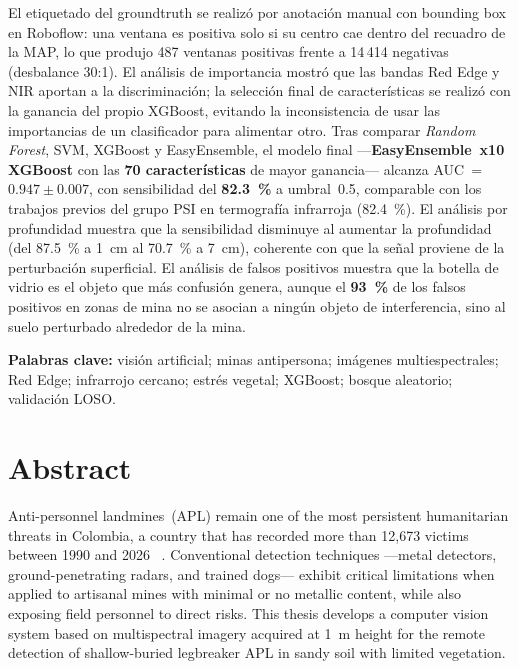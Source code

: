 El etiquetado del groundtruth se realizó por anotación manual con bounding box en
Roboflow: una ventana es positiva solo si su centro cae dentro del recuadro de la
\ac{MAP}, lo que produjo 487 ventanas positivas frente a 14\,414 negativas
(desbalance 30:1). El análisis de importancia mostró que las bandas Red Edge y \ac{NIR} aportan a
la discriminación; la selección final de características se realizó con la ganancia
del propio XGBoost, evitando la inconsistencia de usar las importancias de un
clasificador para alimentar otro. Tras comparar \textit{Random Forest},
\ac{SVM}, XGBoost y EasyEnsemble, el modelo final ---\textbf{EasyEnsemble~x10
XGBoost} con las \textbf{70 características} de mayor ganancia--- alcanza
AUC~=~$0.947 \pm 0.007$, con sensibilidad del \textbf{82.3~\%} a umbral~0.5,
comparable con los trabajos previos del grupo \ac{PSI} en termografía infrarroja
(82.4~\%). El análisis por profundidad muestra que la sensibilidad disminuye al
aumentar la profundidad (del 87.5~\% a \SI{1}{cm} al 70.7~\% a \SI{7}{cm}),
coherente con que la señal proviene de la perturbación superficial. El análisis de
falsos positivos muestra que la botella de vidrio es el objeto que más confusión
genera, aunque el \textbf{93~\%} de los falsos positivos en zonas de mina no se
asocian a ningún objeto de interferencia, sino al suelo perturbado alrededor de la mina.

\vspace{6pt}
\noindent\textbf{Palabras clave:} visión artificial; minas antipersona; imágenes
multiespectrales; Red Edge; infrarrojo cercano; estrés vegetal; XGBoost; bosque
aleatorio; validación LOSO.

\clearpage

\chapter*{Abstract}
\thispagestyle{plain}

Anti-personnel landmines~(APL) remain one of the most persistent humanitarian threats
in Colombia, a country that has recorded more than 12,673 victims between 1990 and 2026~\cite{aicma2026}
. Conventional detection techniques ---metal detectors, ground-penetrating radars,
and trained dogs--- exhibit critical limitations when applied to artisanal mines with
minimal or no metallic content, while also exposing field personnel to direct risks.
This thesis develops a computer vision system based on multispectral imagery acquired
at \SI{1}{m} height for the remote detection of shallow-buried legbreaker APL in sandy
soil with limited vegetation.

